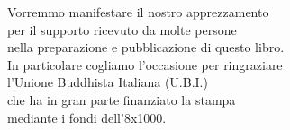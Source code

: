 
\vspace*{4\baselineskip}

{\centering

\begin{minipage}{0.9\linewidth}
\centering

\bigskip

Vorremmo manifestare il nostro apprezzamento\\per il supporto ricevuto da molte persone\\nella preparazione e pubblicazione di questo libro.\\In particolare cogliamo l'occasione per ringraziare\\l'Unione Buddhista Italiana (U.B.I.)\\che ha in gran parte finanziato la stampa\\mediante i fondi dell'8x1000.

\end{minipage}

}
